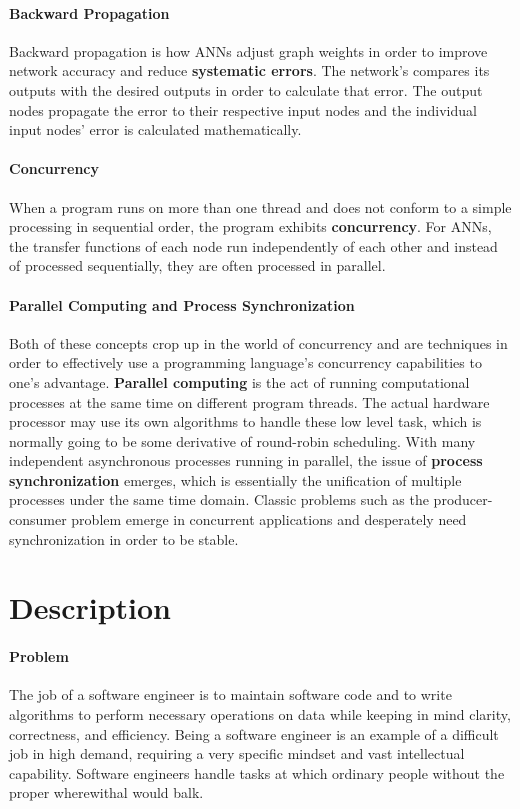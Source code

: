 \documentclass[letterpaper, 10pt]{article}
\begin{document}
	\paragraph{Backward Propagation}
	Backward propagation is how ANNs adjust graph weights in order to improve network accuracy and reduce \textbf{systematic errors}. The network's compares its outputs with the desired outputs in order to calculate that error. The output nodes propagate the error to their respective input nodes and the individual input nodes' error is calculated mathematically.
	\paragraph{Concurrency}
	When a program runs on more than one thread and does not conform to a simple processing in sequential order, the program exhibits \textbf{concurrency}. For ANNs, the transfer functions of each node run independently of each other and instead of processed sequentially, they are often processed in parallel.
	\paragraph{Parallel Computing and Process Synchronization}
	Both of these concepts crop up in the world of concurrency and are techniques in order to effectively use a programming language's concurrency capabilities to one's advantage. \textbf{Parallel computing} is the act of running computational processes at the same time on different program threads. The actual hardware processor may use its own algorithms to handle these low level task, which is normally going to be some derivative of round-robin scheduling. With many independent asynchronous processes running in parallel, the issue of \textbf{process synchronization} emerges, which is essentially the unification of multiple processes under the same time domain. Classic problems such as the producer-consumer problem emerge in concurrent applications and desperately need synchronization in order to be stable.
	
\cleardoublepage
\section{Description}
	\paragraph{Problem} The job of a software engineer is to maintain software code and to write algorithms to perform necessary operations on data while keeping in mind clarity, correctness, and efficiency. Being a software engineer is an example of a difficult job in high demand, requiring a very specific mindset and vast intellectual capability. Software engineers handle tasks at which ordinary people without the proper wherewithal would balk.
	
\end{document}
